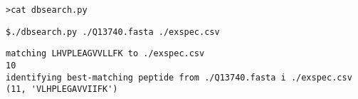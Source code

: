 \documentclass[11pt, a4paper]{article}
\begin{document}
\texttt{>cat dbsearch.py}

\vspace{4em}

\texttt{\$./dbsearch.py ./Q13740.fasta ./exspec.csv}
\begin{lstlisting}
matching LHVPLEAGVVLLFK to ./exspec.csv
10
identifying best-matching peptide from ./Q13740.fasta i ./exspec.csv
(11, 'VLHPLEGAVVIIFK')
\end{lstlisting}
\end{document}
